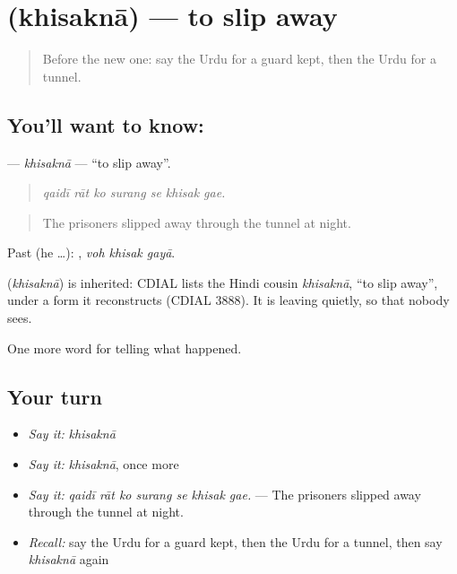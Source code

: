 \section[\texorpdfstring{\ur{کھسکنا} (khisaknā)}{کھسکنا (khisaknā)}]{ (khisaknā) — to slip away}

\label{lesson:UR-C316-khisakna}



\begin{quote}
Before the new one: say the Urdu for a guard kept, then the Urdu for a tunnel.
\end{quote}

\subsection*{You'll want to know: }
\textbf{} — \emph{khisaknā} — \textquotedblleft{}to slip away\textquotedblright{}.

\begin{quote}
      
\end{quote}

\begin{quote}
\emph{qaidī rāt ko surang se khisak gae.}
\end{quote}

\begin{quote}
The prisoners slipped away through the tunnel at night.
\end{quote}

Past (he …):   , \emph{voh khisak gayā}.

\begin{cousinweb}
\textbf{} (\emph{khisaknā}) is inherited: CDIAL lists the Hindi cousin \emph{khisaknā}, \textquotedblleft{}to slip away\textquotedblright{}, under a form it reconstructs (CDIAL 3888). It is leaving quietly, so that nobody sees.
\end{cousinweb}

\begin{grammarlens}[title={What you've built}]
One more word for telling what happened.
\end{grammarlens}

\subsection*{Your turn}
\begin{itemize}
\raggedright
  \item \emph{Say it:} \emph{khisaknā}
  \item \emph{Say it:} \emph{khisaknā}, once more
  \item \emph{Say it:} \emph{qaidī rāt ko surang se khisak gae.} — The prisoners slipped away through the tunnel at night.
  \item \emph{Recall:} say the Urdu for a guard kept, then the Urdu for a tunnel, then say \emph{khisaknā} again
\end{itemize}

